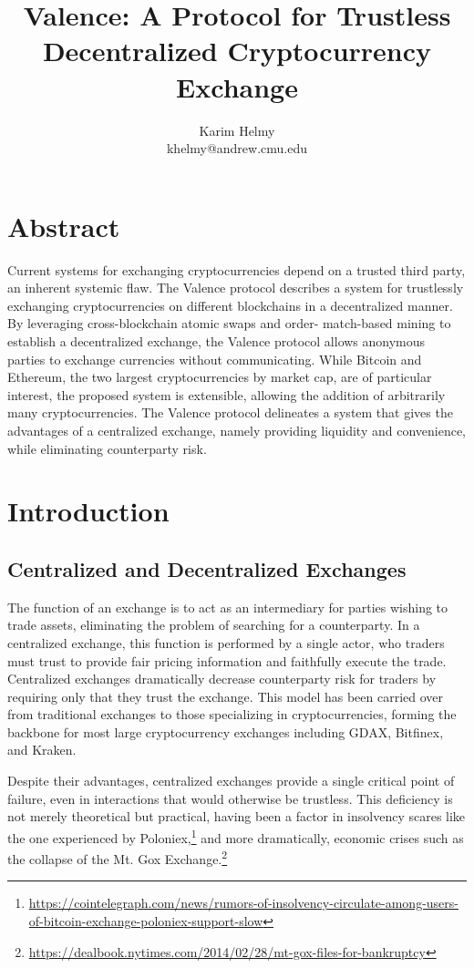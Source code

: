 \documentclass[a4paper]{article}
\title{Valence: A Protocol for Trustless Decentralized
		Cryptocurrency Exchange}
\author{Karim Helmy \\ khelmy@andrew.cmu.edu}
\begin{document}
\maketitle

\section*{Abstract}
	Current systems for exchanging cryptocurrencies depend on a
    trusted third party, an inherent systemic flaw.
    The Valence protocol describes a system for trustlessly
    exchanging cryptocurrencies on different blockchains in a decentralized
    manner. By leveraging cross-blockchain atomic swaps and order-
    match-based mining to establish a decentralized exchange, the
    Valence protocol allows anonymous parties to exchange currencies
    without communicating. While Bitcoin and Ethereum, the two
    largest cryptocurrencies by market cap, are of particular
    interest, the proposed system is extensible, allowing the
    addition of arbitrarily many cryptocurrencies. The Valence
    protocol delineates a system that gives the advantages of a
    centralized exchange, namely providing liquidity and convenience,
    while eliminating counterparty risk.

\tableofcontents
\newpage
{}
\section*{Introduction}
	\subsection*{Centralized and Decentralized Exchanges}
    The function of an exchange is to act as an intermediary for parties
    wishing to trade assets, eliminating the problem of
    searching for a counterparty. In a centralized exchange, this function
    is performed by a single actor, who traders must trust to provide fair
    pricing information and faithfully execute the trade. Centralized exchanges
    dramatically decrease counterparty risk for traders by requiring only
    that they trust the exchange. This model has been carried over from
    traditional exchanges to those specializing in cryptocurrencies, forming
    the backbone for most large cryptocurrency exchanges including GDAX,
    Bitfinex, and Kraken.

    Despite their advantages,
	centralized exchanges provide a single critical point of failure,
    even in interactions that would otherwise be trustless. This
    deficiency is not merely theoretical but practical, having been a
    factor in insolvency scares like the one experienced by
    Poloniex,\footnote[1]
    {\url{https://cointelegraph.com/news/rumors-of-insolvency-circulate-among-users-of-bitcoin-exchange-poloniex-support-slow}} and more
    dramatically, economic crises such as the collapse of the Mt. Gox
    Exchange.\footnote[2]
    {\url{https://dealbook.nytimes.com/2014/02/28/mt-gox-files-for-bankruptcy}}
\end{document}
